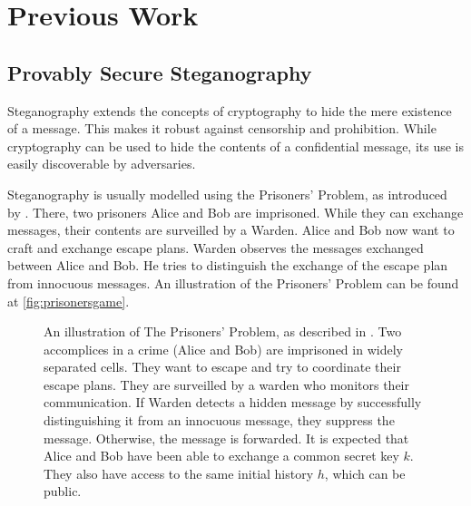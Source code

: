 \chapter{Previous Work}
\label{chap:previous-work}

\section{Provably Secure Steganography}
\label{sec:prov-sec-steg}

Steganography extends the concepts of cryptography to hide the mere existence of a message.
This makes it robust against censorship and prohibition.
While cryptography can be used to hide the contents of a confidential message, its use is easily discoverable by adversaries.


Steganography is usually modelled using the Prisoners' Problem, as introduced by \cite{Simmons1983}.
There, two prisoners Alice and Bob are imprisoned.
While they can exchange messages, their contents are surveilled by a Warden.
Alice and Bob now want to craft and exchange escape plans.
Warden observes the messages exchanged between Alice and Bob.
He tries to distinguish the exchange of the escape plan from innocuous messages.
An illustration of the Prisoners' Problem can be found at \autoref{fig:prisonersgame}.

\begin{figure}[htbp]
\centering
{}
\caption{
An illustration of The Prisoners' Problem, as described in \cite{Simmons1983}.
Two accomplices in a crime (Alice and Bob) are imprisoned in widely separated cells.
They want to escape and try to coordinate their escape plans.
They are surveilled by a warden who monitors their communication.
If Warden detects a hidden message by successfully distinguishing it from an innocuous message, they suppress the message.
Otherwise, the message is forwarded.
It is expected that Alice and Bob have been able to exchange a common secret key $k$.
They also have access to the same initial history $h$, which can be public.
}
\label{fig:prisonersgame}
\end{figure}

